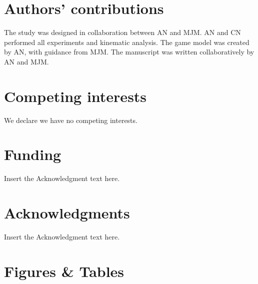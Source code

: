 \documentclass[]{rsos}%
\begin{document}
\section*{Authors' contributions}
The study was designed in collaboration between AN and MJM.
AN and CN performed all experiments and kinematic analysis.
The game model was created by AN, with guidance from MJM. 
The manuscript was written collaboratively by AN and MJM.

\section*{Competing interests}
We declare we have no competing interests.

\section*{Funding}
Insert the Acknowledgment text here.

\section*{Acknowledgments}
Insert the Acknowledgment text here.




\linespread{1}\selectfont %



\pagebreak



\section*{Figures \& Tables}

\linespread{1.3}\selectfont %
\end{document}
